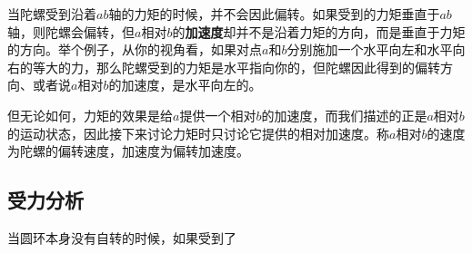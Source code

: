 当陀螺受到沿着$ab$轴的力矩的时候，并不会因此偏转。如果受到的力矩垂直于$ab$轴，则陀螺会偏转，但$a$相对$b$的\textbf{加速度}却并不是沿着力矩的方向，而是垂直于力矩的方向。举个例子，从你的视角看，如果对点$a$和$b$分别施加一个水平向左和水平向右的等大的力，那么陀螺受到的力矩是水平指向你的，但陀螺因此得到的偏转方向、或者说$a$相对$b$的加速度，是水平向左的。



但无论如何，力矩的效果是给$a$提供一个相对$b$的加速度，而我们描述的正是$a$相对$b$的运动状态，因此接下来讨论力矩时只讨论它提供的相对加速度。称$a$相对$b$的速度为陀螺的偏转速度，加速度为偏转加速度。




\subsection{受力分析}



当圆环本身没有自转的时候，如果受到了




























